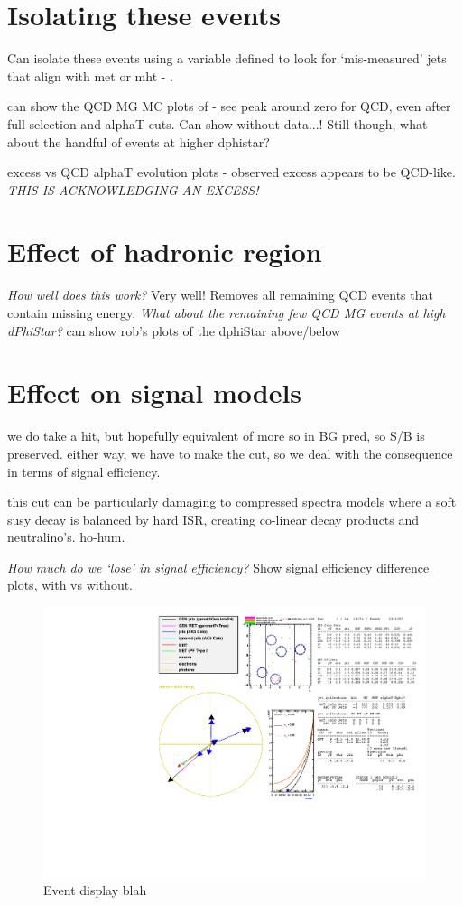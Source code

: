 \section{Isolating these events}

Can isolate these events using a variable defined to look for `mis-measured'
jets that align with met or mht - \mindphistar.

can show the QCD MG MC plots of \dphistar - see peak around zero for QCD, even
after full selection and alphaT cuts. Can show without data...! Still though,
what about the handful of events at higher dphistar?

excess vs QCD alphaT evolution plots - observed excess appears to be QCD-like.
\emph{THIS IS ACKNOWLEDGING AN EXCESS!}

\section{Effect of hadronic region}

\emph{How well does this work?} Very well! Removes all remaining QCD events that
contain missing energy. \emph{What about the remaining few QCD MG events at high
dPhiStar?} can show rob's plots of the dphiStar above/below

\section{Effect on signal models}
we do take a hit, but hopefully equivalent of more so in BG pred, so S/B is
preserved. either way, we have to make the cut, so we deal with the consequence
in terms of signal efficiency.

this cut can be particularly damaging to compressed spectra models where a
soft susy decay is balanced by hard ISR, creating co-linear decay products and
neutralino's. ho-hum.

\emph{How much do we `lose' in signal efficiency?} Show signal efficiency
difference plots, with vs without.

\clearpage

\begin{figure}
    \centering
    \includegraphics[width=\textwidth]
    {Figs/eventDisplays/Had_QCD_MG_MC_HT375_skim_displays_singleEvent.pdf}
    \caption{Event display blah}
    \label{fig:event_display_QCD}
\end{figure}
